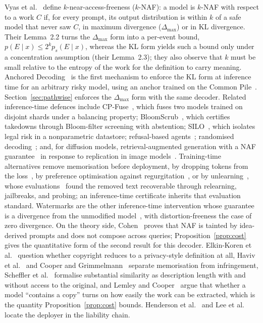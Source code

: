 Vyas et al.~\cite{vyas2023provable} define $k$-near-access-freeness ($k$-NAF): a model is $k$-NAF with respect to a work $C$ if, for every prompt, its output distribution is within $k$ of a safe model that never saw $C$, in maximum divergence ($\Delta_{\max}$) or in KL divergence. Their Lemma~2.2 turns the $\Delta_{\max}$ form into a per-event bound, $p(E \mid x) \le 2^{k} p_s(E \mid x)$, whereas the KL form yields such a bound only under a concentration assumption (their Lemma~2.3); they also observe that $k$ must be small relative to the entropy of the work for the definition to carry meaning. Anchored Decoding~\cite{he2026anchored} is the first mechanism to enforce the KL form at inference time for an arbitrary risky model, using an anchor trained on the Common Pile~\cite{kandpal2025commonpile}. Section~\ref{sec:pathwise} enforces the $\Delta_{\max}$ form with the same decoder. Related inference-time defences include CP-Fuse~\cite{abad2025cpfuse}, which fuses two models trained on disjoint shards under a balancing property; BloomScrub~\cite{zhang2025bloomscrub}, which certifies takedowns through Bloom-filter screening with abstention; SILO~\cite{min2024silo}, which isolates legal risk in a nonparametric datastore; refusal-based agents~\cite{liu2024shield}; randomised decoding~\cite{chen2024randomization}; and, for diffusion models, retrieval-augmented generation with a NAF guarantee~\cite{golatkar2024cpr} in response to replication in image models~\cite{somepalli2023diffusion}. Training-time alternatives remove memorisation before deployment, by dropping tokens from the loss~\cite{hans2024goldfish}, by preference optimisation against regurgitation~\cite{chen2025parapo}, or by unlearning~\cite{eldan2023whos}, whose evaluations~\cite{lynch2024eight,shi2025muse,lucki2025adversarial,deeb2024unlearning} found the removed text recoverable through relearning, jailbreaks, and probing; an inference-time certificate inherits that evaluation standard. Watermarks are the other inference-time intervention whose guarantee is a divergence from the unmodified model~\cite{kirchenbauer2023watermark,kuditipudi2024distortionfree,christ2024undetectable}, with distortion-freeness the case of zero divergence. On the theory side, Cohen~\cite{cohen2025blameless} proves that NAF is tainted by idea-derived prompts and does not compose across queries; Proposition~\ref{prop:cost} gives the quantitative form of the second result for this decoder. Elkin-Koren et al.~\cite{elkinkoren2024copyright} question whether copyright reduces to a privacy-style definition at all, Haviv et al.~\cite{haviv2026separate} and Cooper and Grimmelmann~\cite{cooper2025files} separate memorisation from infringement, Scheffler et al.~\cite{scheffler2022formalizing} formalise substantial similarity as description length with and without access to the original, and Lemley and Cooper~\cite{lemley2026probabilistic} argue that whether a model ``contains a copy'' turns on how easily the work can be extracted, which is the quantity Proposition~\ref{prop:cost} bounds. Henderson et al.~\cite{henderson2023fairuse} and Lee et al.~\cite{lee2024talkin} locate the deployer in the liability chain.

